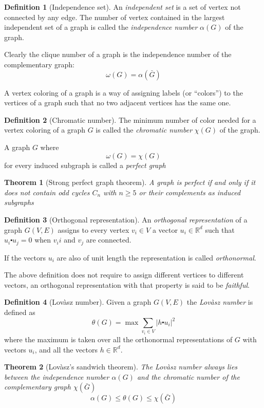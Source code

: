 \documentclass[a4paper]{article}
\newcommand{\abs}[1]{\lvert #1 \rvert}
\newcommand{\Real}{\mathbb{R}}
\newcommand{\sdot}{\centerdot}
\newtheorem{theorem}{Theorem}[section]
\theoremstyle{definition}
\newtheorem{definition}{Definition}[section]
\begin{document}
\begin{definition}[Independence set]
    An \emph{independent set} is a set of vertex not connected by any edge.
    The number of vertex contained in the largest independent set of a graph is called the
    \emph{independence number} $\alpha(G)$ of the graph.
\end{definition}
Clearly the clique number of a graph is the independence number of the
complementary graph:
\begin{equation}
    \omega(G) = \alpha(\bar G)    
\end{equation}

A vertex coloring of a graph is a way of assigning labels (or ``colors'') to the vertices of a
graph such that no two adjacent vertices has the same one.
\begin{definition}[Chromatic number]
    The minimum number of color needed for a vertex coloring of a graph
    $G$ is called the \emph{chromatic number} $\chi(G)$ of the graph.
\end{definition}
A graph $G$ where
\begin{equation}
    \omega(G) = \chi(G)
\end{equation}
for every induced subgraph is called a \emph{perfect graph}
\begin{theorem}[Strong perfect graph theorem]
    A graph is perfect if and only if it does not contain odd cycles $C_n$ with
    $n\ge5$ or their complements as induced subgraphs
    \label{th:strong_perfect_graph}
\end{theorem}

\begin{definition}[Orthogonal representation]
    An \emph{orthogonal representation} of a graph $G(V,E)$ assigns to every vertex
    $v_i\in V$ a vector $u_i \in \Real^d$ such that $u_i \sdot u_j = 0$ when
    $v_ii$ and $v_j$ are connected.
\end{definition}
If the vectors $u_i$ are also of unit length the representation is called
\emph{orthonormal}.

The above definition does not require to assign different vertices to different
vectors, an orthogonal representation with that property is said to be
\emph{faithful}.

\begin{definition}[Lovàsz number]
    Given a graph $G(V,E)$ the \emph{Lovàsz number} is defined as
    \begin{equation}
        \theta(G) = \max \sum_{v_i \in V} \abs{h \sdot u_i}^2
        \label{eq:Lovasz_theta}
    \end{equation}
    where the maximum is taken over all the orthonormal representations of
    $G$ with vectors $u_i$, and all the vectors $h \in \Real^d$.
\end{definition}
\begin{theorem}[Lovàsz's sandwich theorem]
    The Lovàsz number always lies between the independence number $\alpha(G)$
    and the chromatic number of the complementary graph $\chi(\bar G)$
    \begin{equation}
        \alpha(G) \le \theta(G) \le \chi(\bar G) 
        \label{eq:sandwich_theorem}
    \end{equation}
    \label{th:sandwich}
\end{theorem}
\end{document}

